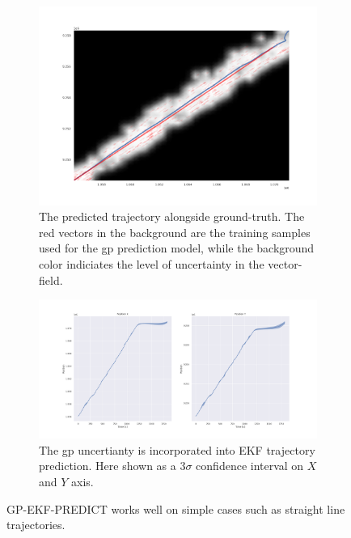 \begin{figure}
    \centering
    \begin{subfigure}{\textwidth}
        \includegraphics[width=\textwidth]{figures/gp_ekf.png}
        \caption{The predicted trajectory alongside ground-truth. The red vectors in the background are the training samples used for the \acrshort{gp} prediction model, while the background color indiciates the level of uncertainty in the vector-field.}
    \end{subfigure}
    \begin{subfigure}{\textwidth}
        \includegraphics[width=\textwidth]{figures/gp_ekf_unc.png}
        \caption{The \acrshort{gp} uncertianty is incorporated into EKF trajectory prediction. Here shown as a $3\sigma$ confidence interval on $X$ and $Y$ axis.}
    \end{subfigure}
    \label{fig:dgp_ekf_predict_only}
    \caption{GP-EKF-PREDICT works well on simple cases such as straight line trajectories.}
\end{figure}

